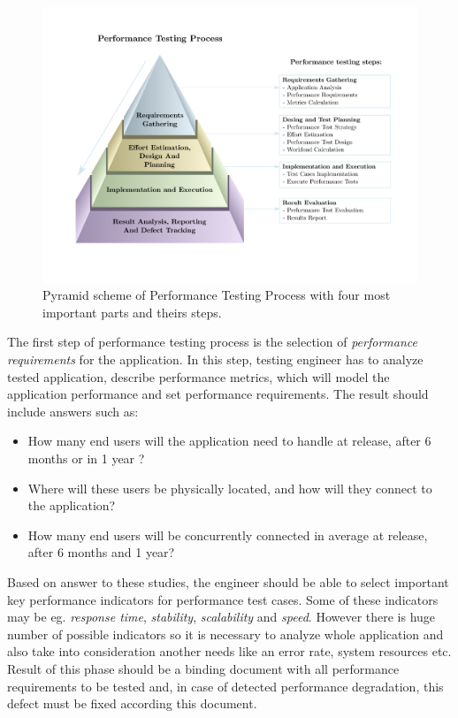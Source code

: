 \begin{figure}[H]
  \centering
  \includegraphics[width=16cm]{obrazky-figures/pyramid.pdf}
  \captionsetup{justification=centering}
  \caption{Pyramid scheme of Performance Testing Process with four most important parts and theirs steps.}
  \label{fig:performace_testing_process}
\end{figure}

The first step of performance testing process is the selection of \emph{performance requirements} for the application. In this step, testing engineer has to analyze tested application, describe performance metrics, which will model the application performance and set performance requirements. The result should include answers such as:

\begin{itemize}
	\setlength\itemsep{0em}
	\item How many end users will the application need to handle at release, after 6 months or in 1 year ?
	\item Where will these users be physically located, and how will they connect to the application?
	\item How many end users will be concurrently connected in average at release, after 6 months and 1 year?
\end{itemize}

Based on answer to these studies, the engineer should be able to select important key performance indicators for performance test cases. Some of these indicators may be eg. \emph{response time}, \emph{stability}, \emph{scalability} and \emph{speed}. However there is huge number of possible indicators so it is necessary to analyze whole application and also take into consideration another needs like an error rate, system resources etc.  Result of this phase should be a binding document with all performance requirements to be tested and, in case of detected performance degradation, this defect must be fixed according this document.

